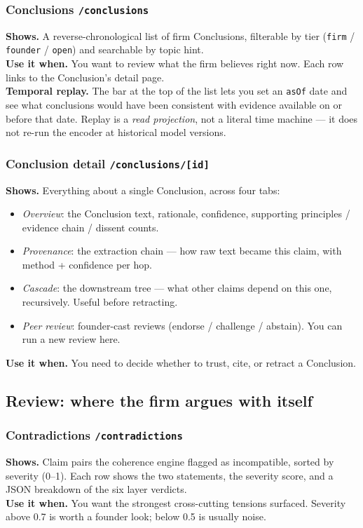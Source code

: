 \documentclass[11pt,letterpaper]{article}
\newcommand{\file}[1]{\texttt{#1}}
\newcommand{\tab}[1]{\textsl{#1}}
\begin{document}
\subsubsection*{Conclusions \hfill \file{/conclusions}}
\textbf{Shows.} A reverse-chronological list of firm Conclusions, filterable by tier (\texttt{firm} / \texttt{founder} / \texttt{open}) and searchable by topic hint. \\
\textbf{Use it when.} You want to review what the firm believes right now. Each row links to the Conclusion's detail page. \\
\textbf{Temporal replay.} The bar at the top of the list lets you set an \file{asOf} date and see what conclusions would have been consistent with evidence available on or before that date. Replay is a \emph{read projection}, not a literal time machine --- it does not re-run the encoder at historical model versions.

\subsubsection*{Conclusion detail \hfill \file{/conclusions/[id]}}
\textbf{Shows.} Everything about a single Conclusion, across four tabs:
\begin{itemize}[leftmargin=*,itemsep=0.2em]
  \item \tab{Overview}: the Conclusion text, rationale, confidence, supporting principles / evidence chain / dissent counts.
  \item \tab{Provenance}: the extraction chain --- how raw text became this claim, with method + confidence per hop.
  \item \tab{Cascade}: the downstream tree --- what other claims depend on this one, recursively. Useful before retracting.
  \item \tab{Peer review}: founder-cast reviews (endorse / challenge / abstain). You can run a new review here.
\end{itemize}
\textbf{Use it when.} You need to decide whether to trust, cite, or retract a Conclusion.

\subsection{Review: where the firm argues with itself}

\subsubsection*{Contradictions \hfill \file{/contradictions}}
\textbf{Shows.} Claim pairs the coherence engine flagged as incompatible, sorted by severity (0--1). Each row shows the two statements, the severity score, and a JSON breakdown of the six layer verdicts. \\
\textbf{Use it when.} You want the strongest cross-cutting tensions surfaced. Severity above 0.7 is worth a founder look; below 0.5 is usually noise.
\end{document}
